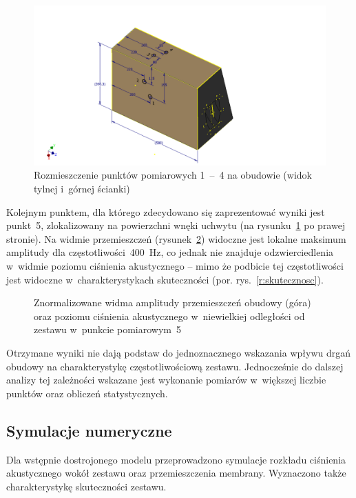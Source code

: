 \documentclass[12pt]{oska}
\newcommand{\range}[2]{\num{#1}~--~\num{#2}}
\begin{document}
	\begin{figure}[!ht]
		\centering
		\includegraphics[width=.8\textwidth,trim={5cm .3cm 5cm 2.7cm},clip]{wibrometr.pdf}
		\caption{Rozmieszczenie punktów pomiarowych \range{1}{4} na obudowie (widok tylnej i~górnej ścianki)}
		\label{r:wibro_pkt}
	\end{figure}
	
	Kolejnym punktem, dla którego zdecydowano się zaprezentować wyniki jest punkt~\num{5}, zlokalizowany na powierzchni wnęki uchwytu (na rysunku~\ref{r:wibro_pkt} po prawej stronie). Na widmie przemieszczeń (rysunek~\ref{r:wibrometr_5}) widoczne jest lokalne maksimum amplitudy dla częstotliwości~\SI{400}{\hertz}, co jednak nie znajduje odzwierciedlenia w~widmie poziomu ciśnienia akustycznego -- mimo że podbicie tej częstotliwości jest widoczne w~charakterystykach skuteczności (por. rys.~\ref{r:skutecznosc}).%
	
	\begin{figure}[H]
		\centering
		\caption{Znormalizowane widma amplitudy przemieszczeń obudowy (góra) oraz poziomu ciśnienia akustycznego w~niewielkiej odległości od zestawu w~punkcie pomiarowym~\num{5}}
		\label{r:wibrometr_5}
	\end{figure}
	
	Otrzymane wyniki nie dają podstaw do jednoznacznego wskazania wpływu drgań obudowy na charakterystykę częstotliwościową zestawu. Jednocześnie do dalszej analizy tej zależności wskazane jest wykonanie pomiarów w~większej liczbie punktów oraz obliczeń statystycznych.
	
	\subsection{Symulacje numeryczne}
	
	Dla wstępnie dostrojonego modelu przeprowadzono symulacje rozkładu ciśnienia akustycznego wokół zestawu oraz przemieszczenia membrany. Wyznaczono także charakterystykę skuteczności zestawu. 
	
\end{document}
